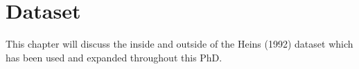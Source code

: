 \chapter{Dataset}\label{ch:dataset}

This chapter will discuss the inside and outside of the Heins (1992) dataset which has been used and expanded throughout this PhD. %





\cleardoublepage


